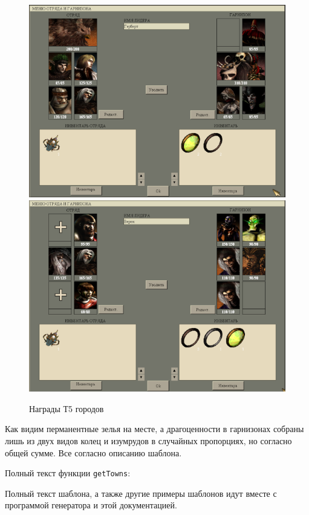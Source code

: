 \begin{figure}[H]
\center
\includegraphics[width=1.0\linewidth]{docImages/townT5Loot.png}
\includegraphics[width=1.0\linewidth]{docImages/townT5Loot2.png}
\caption{Награды Т5 городов}
\end{figure}

Как видим перманентные зелья на месте, а драгоценности в гарнизонах собраны лишь из двух видов колец и изумрудов в случайных пропорциях, но согласно общей сумме. Все согласно описанию шаблона.

Полный текст функции \texttt{getTowns}:

\begin{figure}[H]

\end{figure}

Полный текст шаблона, а также другие примеры шаблонов идут вместе с программой генератора и этой документацией.